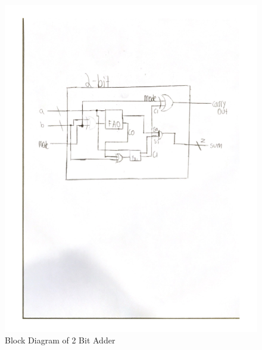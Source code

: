 \documentclass[11pt]{article}
\begin{document}
\begin{figure}
	\includegraphics[width=1.0\textwidth]{"2BitAdderDia"}
	\caption{Block Diagram of 2 Bit Adder}
\end{figure}
\clearpage
\end{document}
